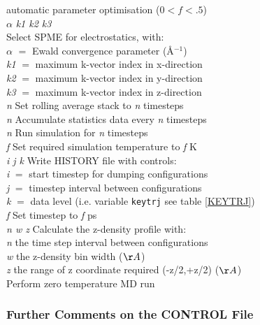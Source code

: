 \begin{tabbing}
\> \>automatic parameter optimisation ($0<f<.5$) \\
  $\alpha$ {\em k1 k2 k3} \\
\> \> Select SPME for electrostatics, with:\\
\> \> $\alpha$ $=$ Ewald convergence parameter (\AA$^{-1}$)\\
\> \> {\em k1} $=$ maximum k-vector index in x-direction\\
\> \> {\em k2} $=$ maximum k-vector index in y-direction\\
\> \> {\em k3} $=$ maximum k-vector index in z-direction\\
 {\em n} \> Set rolling average stack to {\em n}
timesteps \\
 {\em n} \> Accumulate statistics data every {\em n}
timesteps\\
 {\em n} \> Run simulation for {\em n} timesteps \\
 {\em f} \> Set required simulation temperature to {\em
f}  K\\
 {\em i j k} \> Write HISTORY file with controls:\\
\> \> {\em i} $=$ start timestep for dumping configurations\\
\> \> {\em j} $=$ timestep interval between  configurations\\
\> \> {\em k} $=$ data level (i.e. variable {\tt keytrj}
 see table \ref{KEYTRJ})\\
 {\em f} \> Set timestep to {\em f} ps\\
 {\em n w z}\> Calculate the z-density profile with:\\
\> \> {\em n} the time step interval between configurations\\
\> \> {\em w} the z-density bin width ($\AA$) \\
\> \> {\em z} the range of z coordinate required (-z/2,+z/2)  ($\AA$)\\
 \> Perform zero temperature MD run \\
\end{tabbing}

\subsubsection{Further Comments on the CONTROL File}

